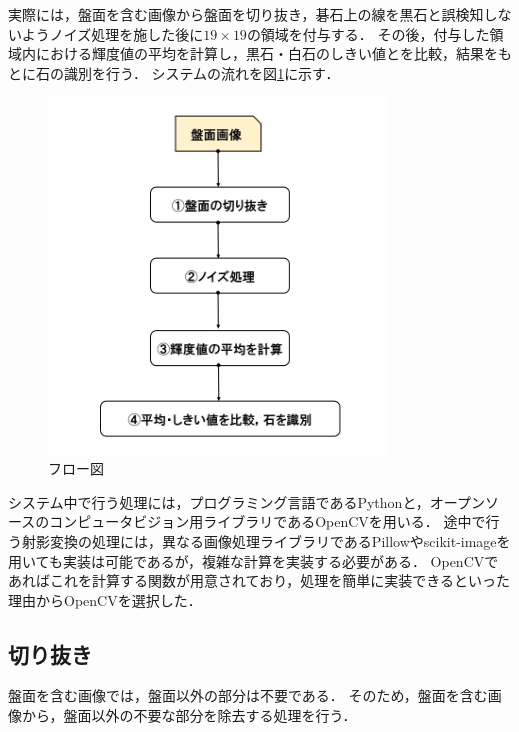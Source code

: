 \documentclass[openright]{nitocs}
\numberwithin{equation}{section}
\begin{document}
        実際には，盤面を含む画像から盤面を切り抜き，碁石上の線を黒石と誤検知しないようノイズ処理を施した後に$19\times19$の領域を付与する．
        その後，付与した領域内における輝度値の平均を計算し，黒石・白石のしきい値とを比較，結果をもとに石の識別を行う．
        システムの流れを図\ref{flow}に示す．
        \begin{figure}[tb] %
            \begin{center}
            \includegraphics[clip,width=90mm]{flow.jpg} 
            \caption{フロー図}
            \label{flow}
            \end{center}
        \end{figure}

        システム中で行う処理には，プログラミング言語であるPythonと，オープンソースのコンピュータビジョン用ライブラリであるOpenCVを用いる．
        途中で行う射影変換の処理には，異なる画像処理ライブラリであるPillowやscikit-imageを用いても実装は可能であるが，複雑な計算を実装する必要がある．
        OpenCVであればこれを計算する関数が用意されており，処理を簡単に実装できるといった理由からOpenCVを選択した．

        \subsection{切り抜き}
        \label{boardCut}
            盤面を含む画像では，盤面以外の部分は不要である．
            そのため，盤面を含む画像から，盤面以外の不要な部分を除去する処理を行う．
\end{document}
